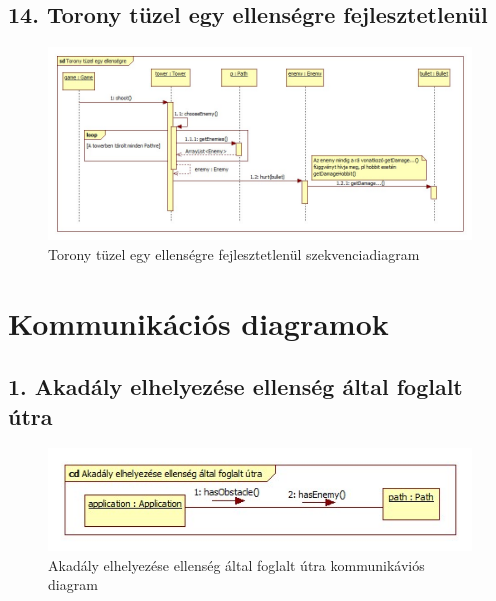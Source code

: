 \subsection{14. Torony tüzel egy ellenségre fejlesztetlenül}
\begin{figure}[H]
\begin{center}
\includegraphics[width=17cm]{chapters/chapter05/images/sd_Torony_tuzel_egy_ellensegre_fejlesztetlenul.jpg}
\caption{Torony tüzel egy ellenségre fejlesztetlenül szekvenciadiagram}
\label{fig:sd_Torony_tuzel_egy_ellensegre_fejlesztetlenul}
\end{center}
\end{figure}



\section{Kommunikációs diagramok}

\subsection{1. Akadály elhelyezése ellenség által foglalt útra}
\begin{figure}[H]
\begin{center}
\includegraphics[width=17cm]{chapters/chapter05/images/cd_Akadaly_elhelyezese_ellenseg_altal_foglalt_utra.jpg}
\caption{Akadály elhelyezése ellenség által foglalt útra kommunikáviós diagram}
\label{fig:cd_Akadaly_elhelyezese_ellenseg_altal_foglalt_utra}
\end{center}
\end{figure}

